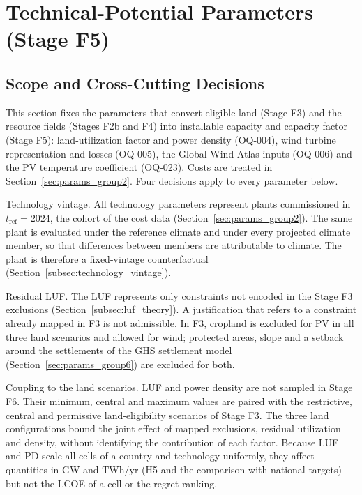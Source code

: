 
\section{Technical-Potential Parameters (Stage F5)}
\label{sec:params_group1}

\subsection{Scope and Cross-Cutting Decisions}
\label{subsec:g1_scope}

This section fixes the parameters that convert eligible land (Stage F3)
and the resource fields (Stages F2b and F4) into installable capacity and
capacity factor (Stage F5): land-utilization factor and power density
(OQ-004), wind turbine representation and losses (OQ-005), the Global
Wind Atlas inputs (OQ-006) and the PV temperature coefficient (OQ-023).
Costs are treated in Section~\ref{sec:params_group2}. Four decisions
apply to every parameter below.

Technology vintage. All technology parameters represent plants
commissioned in $t_{\mathrm{ref}}=2024$, the cohort of the cost data
(Section~\ref{sec:params_group2}). The same plant is evaluated
under the reference climate and under every projected climate member,
so that differences between members are attributable to climate. The
plant is therefore a fixed-vintage counterfactual
(Section~\ref{subsec:technology_vintage}).

Residual LUF. The LUF represents only constraints not encoded in the
Stage F3 exclusions (Section~\ref{subsec:luf_theory}). A justification
that refers to a constraint already mapped in F3 is not admissible. In
F3, cropland is excluded for PV in all three land scenarios and allowed
for wind; protected areas, slope and a setback around the settlements of
the GHS settlement model (Section~\ref{sec:params_group6}) are excluded
for both.

Coupling to the land scenarios. LUF and power density are not sampled in
Stage F6. Their minimum, central and maximum values are paired with the
restrictive, central and permissive land-eligibility scenarios of
Stage F3. The three land configurations bound the joint effect of mapped
exclusions, residual utilization and density, without identifying the
contribution of each factor. Because LUF and PD scale all cells of a
country and technology uniformly, they affect quantities in GW and
TWh/yr (H5 and the comparison with national targets) but not the LCOE
of a cell or the regret ranking.

